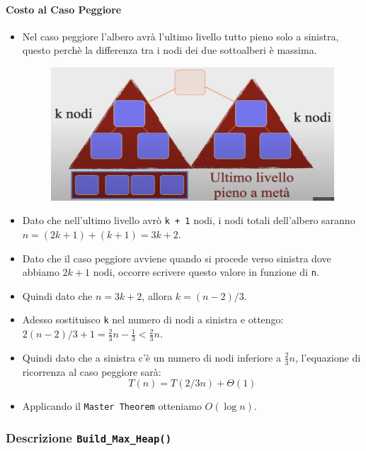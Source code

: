 \documentclass{article}
\begin{document}
\paragraph{Costo al Caso Peggiore}

\begin{itemize}
    \item Nel caso peggiore l'albero avrà l'ultimo livello tutto pieno solo a sinistra, questo perchè la differenza tra i nodi dei due sottoalberi è massima.
    \begin{figure}[h]
        \includegraphics[scale=0.6]{img/costo_maxheapify.png}
        \centering
    \end{figure}
    \item Dato che nell'ultimo livello avrò \verb|k + 1| nodi, i nodi totali dell'albero saranno $n = (2k + 1) + (k + 1) = 3k + 2$.
    \item Dato che il caso peggiore avviene quando si procede verso sinistra dove abbiamo $2k + 1$ nodi, occorre scrivere questo valore in funzione di \verb|n|.
    \item Quindi dato che $n = 3k + 2$, allora $k = (n - 2)/3$.
    \item Adesso sostituisco \verb|k| nel numero di nodi a sinistra e ottengo: $2(n - 2)/3 + 1 = \frac{2}{3} n - \frac{1}{3} < \frac{2}{3} n$.
    \item Quindi dato che a sinistra c'è un numero di nodi inferiore a $\frac{2}{3} n$, l'equazione di ricorrenza al caso peggiore sarà:
    \begin{equation*}
        T(n) = T(2/3 n) + \Theta(1)
    \end{equation*}
    \item Applicando il \verb|Master Theorem| otteniamo $O(\log n)$.
\end{itemize}

\cprotect\subsubsection{Descrizione \verb|Build_Max_Heap()|}
\end{document}
